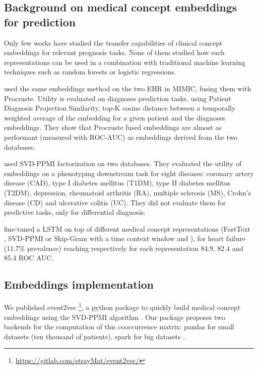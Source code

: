 \documentclass[french,12pt,twoside,a4paper]{book}
\begin{document}
\begin{appendices}
  \subsection{Background on medical concept embeddings for prediction}%
  \label{apd:background_static_embeddings}%

  Only few works have studied the transfer capabilities of clinical concept
  embeddings for relevant prognosis tasks. None of them studied how such
  representations can be used in a combination with traditional machine learning
  techniques such as random forests or logistic regressions.

  \cite{huang2018privacy} used the same embeddings method on the two EHR in MIMIC,
  fusing them with Procruste. Utility is evaluated on diagnoses prediction tasks,
  using Patient Diagnosis Projection Similarity, top-K cosine distance between a
  temporally weighted average of the embedding for a given patient and the
  diagnoses embeddings. They show that Procruste fused embeddings are almost as
  performant (measured with ROC-AUC) as embeddings derived from the two databases.

  \cite{hong2021clinical} used SVD-PPMI factorization on two databases. They
  evaluated the utility of embeddings on a phenotyping downstream task for eight
  diseases: coronary artery disease (CAD), type I diabetes mellitus (T1DM), type
  II diabetes mellitus (T2DM), depression, rheumatoid arthritis (RA), multiple
  sclerosis (MS), Crohn's disease (CD) and ulcerative colitis (UC). They did not
  evaluate them for predictive tasks, only for differential diagnosis.

  \cite{xiang2019time} fine-tuned a LSTM on top of different medical concept
  representations (FastText \citep{bojanowski2017enriching}, SVD-PPMI or Skip-Gram
  with a time context window \citep{beam2019clinical} and ), for heart failure
  (11.7\% prevalence) reaching respectively for each representation 84.9, 82.4
  and 85.4 ROC AUC.

  \subsection{Embeddings implementation}\label{apd:medical_concept_embeddings:implementation}

  We published event2vec \footnote{\url{https://gitlab.com/strayMat/event2vec/}},
  a python package to quickly build medical concept embeddings using the SVD-PPMI
  algorithm \cite{beam2019clinical, levy2014neural}. Our package proposes two
  backends for the computation of this cooccurrence matrix: pandas for small
  datasets (ten thousand of patients), spark for big datasets
  \citep{salloum2016big}.


\end{appendices}
\end{document}
